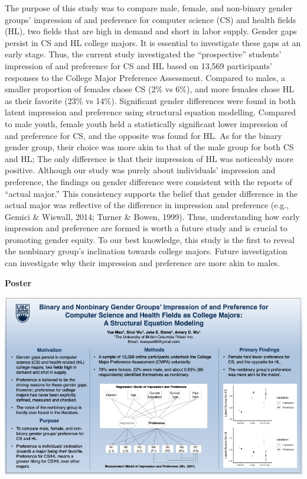 \documentclass[
]{book}
\begin{document}
The purpose of this study was to compare male, female, and non-binary gender groups' impression of and preference for computer science (CS) and health fields (HL), two fields that are high in demand and short in labor supply. Gender gaps persist in CS and HL college majors. It is essential to investigate these gaps at an early stage. Thus, the current study investigated the ``prospective'' students' impression of and preference for CS and HL based on 13,569 participants' responses to the College Major Preference Assessment. Compared to males, a smaller proportion of females chose CS (2\% vs 6\%), and more females chose HL as their favorite (23\% vs 14\%). Significant gender differences were found in both latent impression and preference using structural equation modelling. Compared to male youth, female youth held a statistically significant lower impression of and preference for CS, and the opposite was found for HL. As for the binary gender group, their choice was more akin to that of the male group for both CS and HL; The only difference is that their impression of HL was noticeably more positive. Although our study was purely about individuals' impression and preference, the findings on gender difference were consistent with the reports of ``actual major.'' This consistency supports the belief that gender difference in the actual major was reflective of the difference in impression and preference (e.g., Gemici \& Wiswall, 2014; Turner \& Bowen, 1999). Thus, understanding how early impression and preference are formed is worth a future study and is crucial to promoting gender equity. To our best knowledge, this study is the first to reveal the nonbinary group's inclination towards college majors. Future investigation can investigate why their impression and preference are more akin to males.

\textbf{Poster}

\includegraphics{Content/YU.png}
\end{document}
